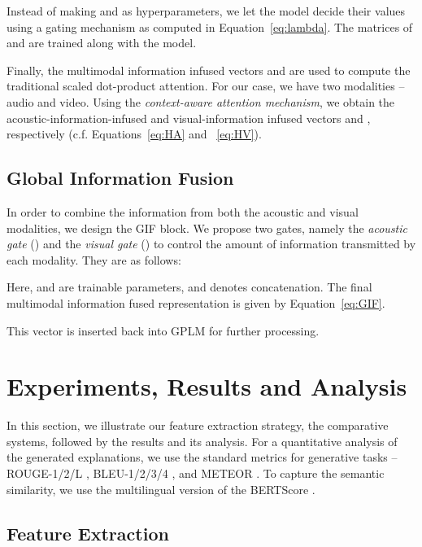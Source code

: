 \documentclass[11pt]{article}
\begin{document}
Instead of making  and  as hyperparameters, we let the model decide their values using a gating mechanism as computed in Equation~\ref{eq:lambda}. The matrices of  and  are trained along with the model.

\vspace{-1em}


Finally, the multimodal information infused vectors  and  are used to compute the traditional scaled dot-product attention. For our case, we have two modalities -- audio and video. Using the \textit{context-aware attention mechanism}, we obtain the acoustic-information-infused and visual-information infused vectors  and , respectively (c.f. Equations~\ref{eq:HA} and ~\ref{eq:HV}).

\vspace{-5mm}


\subsection{Global Information Fusion}
In order to combine the information from both the acoustic and visual modalities, we design the GIF block. We propose two gates, namely the \textit{acoustic gate}  () and the \textit{visual gate} () to control the amount of information transmitted by each modality. They are as follows:


Here,  and  are trainable parameters, and  denotes concatenation. The final multimodal information fused representation  is given by Equation~\ref{eq:GIF}.


This vector  is inserted back into GPLM for further processing.

\section{Experiments, Results and Analysis}
In this section, we illustrate our feature extraction strategy, the comparative systems, followed by the results and its analysis. For a quantitative analysis of the generated explanations,  we use the standard metrics for generative tasks -- ROUGE-1/2/L \cite{lin-2004-rouge}, BLEU-1/2/3/4 \cite{papineni2002bleu}, and METEOR \cite{denkowski:lavie:meteor-wmt:2014}. To capture the semantic similarity, we use the multilingual version of the BERTScore \citep{zhang2019bertscore}.

\subsection{Feature Extraction}
\end{document}
